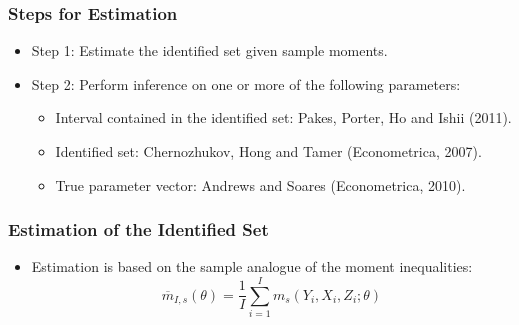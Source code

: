 \begin{frame}
\frametitle{Steps for Estimation}

\begin{itemize}
	\item Step 1: Estimate the identified set given sample moments.
	\item Step 2: Perform inference on one or more of the following parameters:
	\begin{itemize}
		\item Interval contained in the identified set: Pakes, Porter, Ho and Ishii (2011).
		\item Identified set: Chernozhukov, Hong and Tamer (Econometrica, 2007).
		\item True parameter vector: Andrews and Soares (Econometrica, 2010).
	\end{itemize}
\end{itemize}
\end{frame}
\begin{frame}[label=estset]
\frametitle{Estimation of the Identified Set}

\begin{itemize}
	\item Estimation is based on the sample analogue of the moment inequalities:
	\begin{equation*}
	\overline{m}_{I,s}(\theta)=\frac{1}{I}\sum_{i=1}^{I}m_{s}(Y_{i},X_{i},Z_{i};\theta)
	\end{equation*}
	\begin{figure}[h!]
	\begin{center}
	\end{center}
	\end{figure}	
\end{itemize}
\hyperlink{estsetb}{}
\end{frame}
